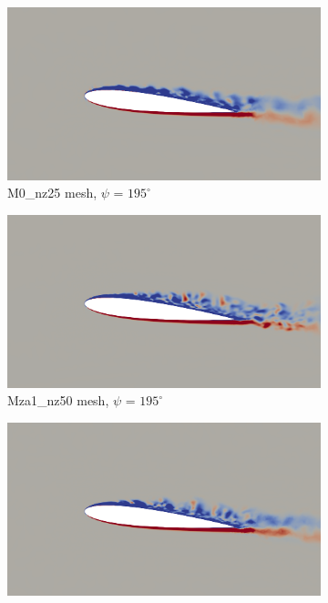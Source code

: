 \begin{figure}[H]
\centering
\begin{subfigure}[b]{0.475\textwidth}
\centering
\includegraphics[width=1\textwidth]{figures/adapt_strat/vorticity_plots/M0/phase_195.png}
\caption{M0\_nz25 mesh, $\psi$ = $195^\circ$}
\label{fig:M0_psi195}
\end{subfigure}
\begin{subfigure}[b]{0.475\textwidth}
\centering
\includegraphics[width=1\textwidth]{figures/adapt_strat/vorticity_plots/Mza1_50/phase_195.png}
\caption{Mza1\_nz50 mesh, $\psi$ = $195^\circ$}
\label{fig:Ma1_psi195}
\end{subfigure}
\begin{subfigure}[b]{0.475\textwidth}
\centering
\includegraphics[width=1\textwidth]{figures/adapt_strat/vorticity_plots/Msa1_50/phase_195.png}

\end{subfigure}
\end{figure}
